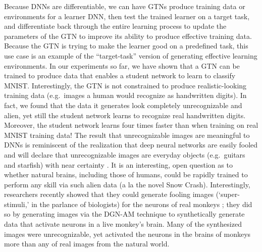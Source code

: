 \documentclass{article}
\begin{document}
Because DNNs are differentiable, we can have GTNs produce training data or environments for a learner DNN, then test the trained learner on a target task, and differentiate back through the entire learning process to update the parameters of the GTN to improve its ability to produce effective training data. Because the GTN is trying to make the learner good on a predefined task, this use case is an example of the ``target-task'' version of generating effective learning environments. In our experiments so far, we have shown that a GTN can be trained to produce data that enables a student network to learn to classify MNIST. Interestingly, the GTN is not constrained to produce realistic-looking training data (e.g.\ images a human would recognize as handwritten digits). In fact, we found that the data it generates look completely unrecognizable and alien, yet still the student network learns to recognize real handwritten digits. Moreover, the student network learns four times faster than when training on real MNIST training data! The result that unrecognizable images are meaningful to DNNs is reminiscent of the realization that deep neural networks are easily fooled and will declare that unrecognizable images are everyday objects (e.g.\ guitars and starfish) with near certainty \cite{nguyen2015deep}. 
It is an interesting, open question as to whether natural brains, including those of humans, could be rapidly trained to perform any skill via such alien data (a la the novel Snow Crash). Interestingly, researchers recently showed that they could generate fooling images (`super-stimuli,' in the parlance of biologists) for the neurons of real monkeys \cite{ponce2019cell}; they did so by generating images via the DGN-AM technique \cite{nguyen2016synthesizing} to synthetically generate data that activate neurons in a live monkey's brain. Many of the synthesized images were unrecognizable, yet activated the neurons in the brains of monkeys more than any of real images from the natural world. 
\end{document}
